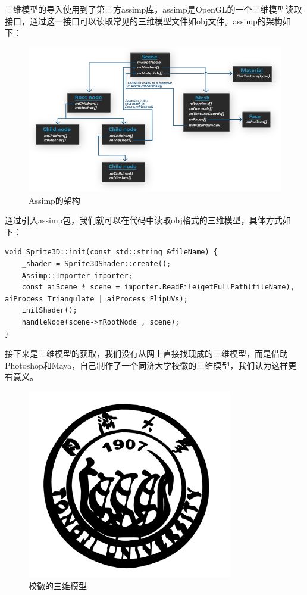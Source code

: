        \begin{spacing}{2.5}
    三维模型的导入使用到了第三方assimp库，assimp是OpenGL的一个三维模型读取接口，通过这一接口可以读取常见的三维模型文件如obj文件。assimp的架构如下：
    \begin{figure}[H]
    	\centering
		\includegraphics[width=1.0\textwidth]{images/assimp.png}
		\caption{Assimp的架构}
		\label{shininess}
    \end{figure}
    
    
    通过引入assimp包，我们就可以在代码中读取obj格式的三维模型，具体方式如下：
        \end{spacing}

    \begin{lstlisting}
void Sprite3D::init(const std::string &fileName) {
    _shader = Sprite3DShader::create();
    Assimp::Importer importer;
    const aiScene * scene = importer.ReadFile(getFullPath(fileName), aiProcess_Triangulate | aiProcess_FlipUVs);
    initShader();
    handleNode(scene->mRootNode , scene);
}	
    \end{lstlisting}

\begin{spacing}{2.5}
接下来是三维模型的获取，我们没有从网上直接找现成的三维模型，而是借助Photoshop和Maya，自己制作了一个同济大学校徽的三维模型，我们认为这样更有意义。
    \begin{figure}[H]
    	\centering
		\includegraphics[width=0.8\textwidth]{images/tj-logo.png}
		\caption{校徽的三维模型}
		\label{shininess}
    \end{figure}
\end{spacing}


